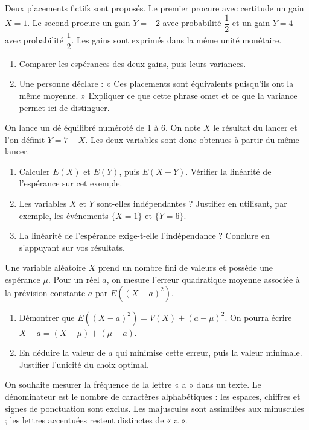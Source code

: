 Deux placements fictifs sont proposés. Le premier procure avec certitude un gain $X=1$. Le second procure un gain $Y=-2$ avec probabilité $\dfrac12$ et un gain $Y=4$ avec probabilité $\dfrac12$. Les gains sont exprimés dans la même unité monétaire.
\begin{enumerate}[label=\arabic*.]
\item Comparer les espérances des deux gains, puis leurs variances.
\item Une personne déclare : « Ces placements sont équivalents puisqu’ils ont la même moyenne. » Expliquer ce que cette phrase omet et ce que la variance permet ici de distinguer.
\end{enumerate}
On lance un dé équilibré numéroté de 1 à 6. On note $X$ le résultat du lancer et l’on définit $Y=7-X$. Les deux variables sont donc obtenues à partir du même lancer.
\begin{enumerate}[label=\arabic*.]
\item Calculer $E(X)$ et $E(Y)$, puis $E(X+Y)$. Vérifier la linéarité de l’espérance sur cet exemple.
\item Les variables $X$ et $Y$ sont-elles indépendantes ? Justifier en utilisant, par exemple, les événements $\{X=1\}$ et $\{Y=6\}$.
\item La linéarité de l’espérance exige-t-elle l’indépendance ? Conclure en s’appuyant sur vos résultats.
\end{enumerate}
Une variable aléatoire $X$ prend un nombre fini de valeurs et possède une espérance $\mu$. Pour un réel $a$, on mesure l’erreur quadratique moyenne associée à la prévision constante $a$ par $E((X-a)^2)$.
\begin{enumerate}[label=\arabic*.]
\item Démontrer que $E((X-a)^2)=V(X)+(a-\mu)^2$. On pourra écrire $X-a=(X-\mu)+(\mu-a)$.
\item En déduire la valeur de $a$ qui minimise cette erreur, puis la valeur minimale. Justifier l’unicité du choix optimal.
\end{enumerate}
On souhaite mesurer la fréquence de la lettre « a » dans un texte. Le dénominateur est le nombre de caractères alphabétiques : les espaces, chiffres et signes de ponctuation sont exclus. Les majuscules sont assimilées aux minuscules ; les lettres accentuées restent distinctes de « a ».
